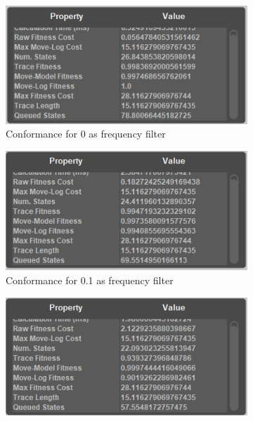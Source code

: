 \begin{figure}[!htbp]
\centering
\begin{subfigure}{.24\textwidth}
  \centering
  \includegraphics[width=\linewidth]{ApprovConf0.PNG}
  \caption{Conformance for 0 as frequency filter}
  \label{fig:ApprovCon0-1}
\end{subfigure}%
\begin{subfigure}{.24\textwidth}
  \centering
  \includegraphics[width=\linewidth]{ApprovConf0-1.PNG}
  \caption{Conformance for 0.1 as frequency filter}
  \label{fig:ApprovCon0-1}
\end{subfigure}
\begin{subfigure}{.24\textwidth}
  \centering
  \includegraphics[width=\linewidth]{ApprovConf0-2.PNG}

\end{subfigure}
\end{figure}
